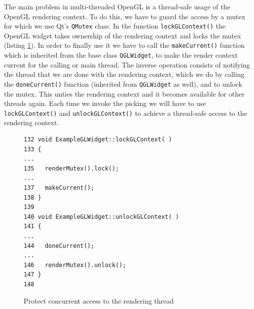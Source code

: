 \documentclass[jou,noapacite]{apa}
\begin{document}
%
%
The main problem in multi-threaded OpenGL is a thread-safe usage of the OpenGL
rendering context.
%
To do this, we have to guard the access by a mutex for which we use
Qt's \lstinline|QMutex| class.
%
In the function \lstinline|lockGLContext()| the OpenGL widget takes ownership of
the rendering context and locks the mutex (listing \ref{lst:concur}).
%
In order to finally use it we have to call the \lstinline|makeCurrent()|
function which is inherited from the base class \lstinline|QGLWidget|, to make
the render context current for the calling or main thread.
%
The inverse operation consists of notifying the thread that we are done with
the rendering context, which we do by calling the \lstinline|doneCurrent()|
function (inherited from \lstinline|QGLWidget| as well), and to unlock the
mutex.
%
This unties the rendering context and it becomes available for other threads
again.
%
Each time we invoke the picking we will have to use \lstinline|lockGLContext()|
and \lstinline|unlockGLContext()| to achieve a thread-safe access to the
rendering context.
\begin{figure}[h]
\begin{lstlisting}[basicstyle=\scriptsize]
132 void ExampleGLWidget::lockGLContext( )
133 {
...
135   renderMutex().lock();
...
137   makeCurrent();
138 }
139
140 void ExampleGLWidget::unlockGLContext( )
141 {
...
144   doneCurrent();
...
146   renderMutex().unlock();
147 }
148
\end{lstlisting}
\caption{Protect concurrent access to the rendering thread}
\label{lst:concur}
\end{figure}
\end{document}
